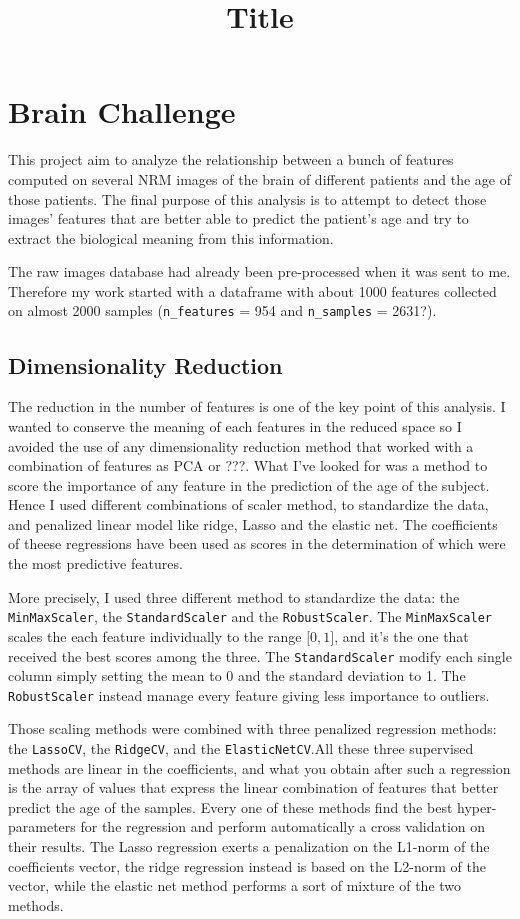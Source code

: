 \documentclass[12pt]{article}
\begin{document}
\title{Title}

\section*{Brain Challenge}

This project aim to analyze the relationship between a bunch of features computed on several NRM images of the brain of different patients and the age of those patients. The final purpose of this analysis is to attempt to detect those images' features that are better able to predict the patient's age and try to extract the biological meaning from this information.

The raw images database had already been pre-processed when it was sent to me. Therefore my work started with a dataframe with about 1000 features collected on almost 2000 samples (\texttt{n\_features} = 954 and \texttt{n\_samples} = 2631?).


\subsection*{Dimensionality Reduction}
The reduction in the number of features is one of the key point of this analysis. I wanted to conserve the meaning of each features in the reduced space so I avoided the use of any dimensionality reduction method that worked with a combination of features as PCA or ???. What I've looked for was a method to score the importance of any feature in the prediction of the age of the subject. Hence I used different combinations of scaler method, to standardize the data, and penalized linear model like ridge, Lasso and the elastic net. The coefficients of theese regressions have been used as scores in the determination of which were the most predictive features.

More precisely, I used three different method to standardize the data: the \texttt{MinMaxScaler}, the \texttt{StandardScaler} and the \texttt{RobustScaler}. The \texttt{MinMaxScaler} scales the each feature individually to the range $\lbrack 0,1 \rbrack$, and it's the one that received the best scores among the three. The \texttt{StandardScaler} modify each single column simply setting the mean to 0 and the standard deviation to 1. The \texttt{RobustScaler} instead manage every feature giving less importance to outliers.

Those scaling methods were combined with three penalized regression methods: the \texttt{LassoCV}, the \texttt{RidgeCV}, and the \texttt{ElasticNetCV}.All these three supervised methods are linear in the coefficients, and what you obtain after such a regression is the array of values that express the linear combination of features that better predict the age of the samples. Every one of these methods find the best hyper-parameters for the regression and perform automatically a cross validation on their results.  The Lasso regression exerts a penalization on the L1-norm of the coefficients vector, the ridge regression instead is based on the L2-norm of the vector, while the elastic net method performs a sort of mixture of the two methods.
\end{document}
